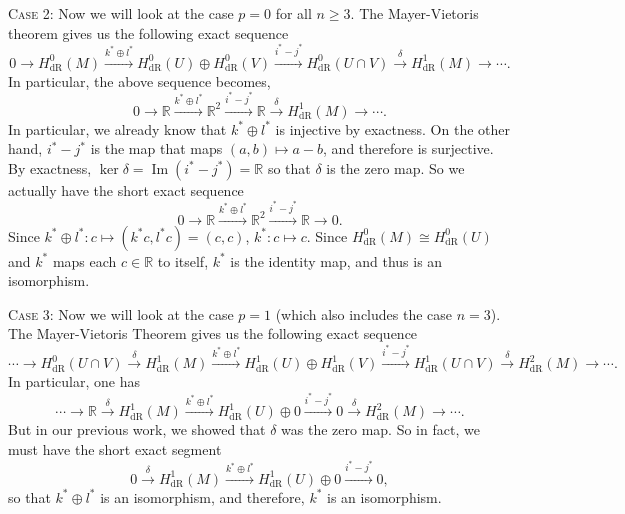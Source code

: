 \documentclass{article}
\begin{document}
	\textsc{Case 2:} Now we will look at the case $p = 0$ for all $n \geq 3$. The Mayer-Vietoris theorem gives us the following exact sequence 
	\begin{equation*}
		0 \to H^{0}_{\text{dR}}(M) \xrightarrow{k^{\ast} \oplus l^{\ast}} H^{0}_{\text{dR}}(U) \oplus H^{0}_{\text{dR}}(V) \xrightarrow{i^{\ast}-j^{\ast}} H^{0}_{\text{dR}}(U \cap V) \xrightarrow{\delta} H^{1}_{\text{dR}}(M) \to \dotsm. 
	\end{equation*}
	In particular, the above sequence becomes, 
	\begin{equation*}
		0 \to \mathbb{R} \xrightarrow{k^{\ast} \oplus l^{\ast}} \mathbb{R}^{2} \xrightarrow{i^{\ast} - j^{\ast}} \mathbb{R} \xrightarrow{\delta} H^{1}_{\text{dR}}(M) \to \dotsm. 
	\end{equation*}
	In particular, we already know that $k^{\ast} \oplus l^{\ast}$ is injective by exactness. On the other hand, $i^{\ast} - j^{\ast}$ is the map that maps $(a, b) \mapsto a- b$, and therefore is surjective. By exactness, $\ker{\delta} = \operatorname{Im}(i^{\ast} - j^{\ast}) = \mathbb{R}$ so that $\delta$ is the zero map. So we actually have the short exact sequence 
	\begin{equation*}
		0 \to \mathbb{R} \xrightarrow{k^{\ast} \oplus l^{\ast}} \mathbb{R}^{2} \xrightarrow{i^{\ast} - j^{\ast}} \mathbb{R} \to 0. 
	\end{equation*}
	Since $k^{\ast} \oplus l^{\ast}: c \mapsto (k^{\ast}c, l^{\ast}c) = (c, c)$, $k^{\ast}: c \mapsto c$. Since $H^{0}_{\text{dR}}(M) \cong H^{0}_{\text{dR}}(U)$ and $k^{\ast}$ maps each $c \in \mathbb{R}$ to itself, $k^{\ast}$ is the identity map, and thus is an isomorphism. 
	
	\textsc{Case 3:} Now we will look at the case $p = 1$ (which also includes the case $n = 3$). The Mayer-Vietoris Theorem gives us the following exact sequence 
	\begin{equation*}
		\dotsm \to H^{0}_{\text{dR}}(U \cap V) \xrightarrow{\delta} H^{1}_{\text{dR}}(M) \xrightarrow{k^{\ast} \oplus l^{\ast}} H^{1}_{\text{dR}}(U) \oplus H^{1}_{\text{dR}}(V) \xrightarrow{i^{\ast} - j^{\ast}} H^{1}_{\text{dR}}(U \cap V) \xrightarrow{\delta} H^{2}_{\text{dR}}(M) \to \dotsm. 
	\end{equation*}
	In particular, one has 
	\begin{equation*}
		\dotsm \to \mathbb{R} \xrightarrow{\delta} H^{1}_{\text{dR}}(M) \xrightarrow{k^{\ast} \oplus l^{\ast}} H^{1}_{\text{dR}}(U) \oplus 0 \xrightarrow{i^{\ast} - j^{\ast}} 0 \xrightarrow{\delta} H^{2}_{\text{dR}}(M) \to \dotsm. 
	\end{equation*}
	But in our previous work, we showed that $\delta$ was the zero map. So in fact, we must have the short exact segment 
	\begin{equation*}
		0 \xrightarrow{\delta} H^{1}_{\text{dR}}(M) \xrightarrow{k^{\ast} \oplus l^{\ast}} H^{1}_{\text{dR}}(U) \oplus 0 \xrightarrow{i^{\ast} - j^{\ast}} 0, 
	\end{equation*}
	so that $k^{\ast} \oplus l^{\ast}$ is an isomorphism, and therefore, $k^{\ast}$ is an isomorphism. 
	
\end{document}
